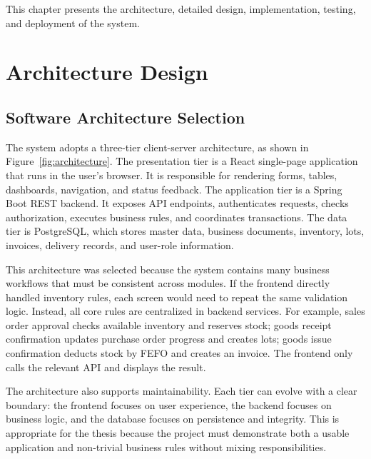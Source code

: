 This chapter presents the architecture, detailed design, implementation, testing,
and deployment of the system.

\section{Architecture Design}

\subsection{Software Architecture Selection}
The system adopts a three-tier client-server architecture, as shown in
Figure~\ref{fig:architecture}. The presentation tier is a React single-page
application that runs in the user's browser. It is responsible for rendering
forms, tables, dashboards, navigation, and status feedback. The application tier
is a Spring Boot REST backend. It exposes API endpoints, authenticates requests,
checks authorization, executes business rules, and coordinates transactions. The
data tier is PostgreSQL, which stores master data, business documents,
inventory, lots, invoices, delivery records, and user-role information.

This architecture was selected because the system contains many business
workflows that must be consistent across modules. If the frontend directly
handled inventory rules, each screen would need to repeat the same validation
logic. Instead, all core rules are centralized in backend services. For example,
sales order approval checks available inventory and reserves stock; goods
receipt confirmation updates purchase order progress and creates lots; goods
issue confirmation deducts stock by FEFO and creates an invoice. The frontend
only calls the relevant API and displays the result.

The architecture also supports maintainability. Each tier can evolve with a
clear boundary: the frontend focuses on user experience, the backend focuses on
business logic, and the database focuses on persistence and integrity. This is
appropriate for the thesis because the project must demonstrate both a usable
application and non-trivial business rules without mixing responsibilities.

